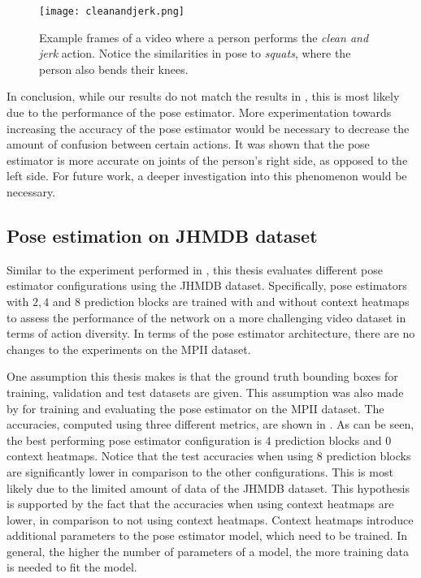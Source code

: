 \begin{figure}[htb!]
    \centering
    \texttt{[image: cleanandjerk.png]}
    \caption{Example frames of a video where a person performs the \textit{clean and jerk} action. Notice the similarities in pose to \textit{squats}, where the person also bends their knees.}
    \label{fig:cleanandjerk}
\end{figure}

In conclusion, while our results do not match the results in \cite{luvizon_2d/3d_2018}, this is most likely due to the performance of the pose estimator.
More experimentation towards increasing the accuracy of the pose estimator would be necessary to decrease the amount of confusion between certain actions.
It was shown that the pose estimator is more accurate on joints of the person's right side, as opposed to the left side.
For future work, a deeper investigation into this phenomenon would be necessary.

\subsection{Pose estimation on JHMDB dataset}
\label{sec:exp-pose-jhmdb}
Similar to the experiment performed in , this thesis evaluates different pose estimator configurations using the JHMDB dataset.
Specifically, pose estimators with $2, 4$ and $8$ prediction blocks are trained with and without context heatmaps to assess the performance of the network on a more challenging video dataset in terms of action diversity.
In terms of the pose estimator architecture, there are no changes to the experiments on the MPII dataset.

One assumption this thesis makes is that the ground truth bounding boxes for training, validation and test datasets are given.
This assumption was also made by \cite{luvizon_2d/3d_2018} for training and evaluating the pose estimator on the MPII dataset.
The accuracies, computed using three different metrics, are shown in .
As can be seen, the best performing pose estimator configuration is $4$ prediction blocks and $0$ context heatmaps.
Notice that the test accuracies when using $8$ prediction blocks are significantly lower in comparison to the other configurations.
This is most likely due to the limited amount of data of the JHMDB dataset.
This hypothesis is supported by the fact that the accuracies when using context heatmaps are lower, in comparison to not using context heatmaps.
Context heatmaps introduce additional parameters to the pose estimator model, which need to be trained.
In general, the higher the number of parameters of a model, the more training data is needed to fit the model.

